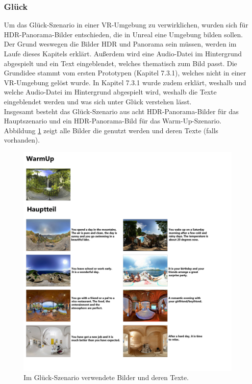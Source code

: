 \subsubsection{Gl{\"u}ck} \label{glueck-4}







Um das Gl{\"u}ck-Szenario in einer VR-Umgebung zu verwirklichen, wurden sich f{\"u}r HDR-Panorama-Bilder entschieden, die in Unreal eine Umgebung bilden sollen. 
Der Grund weswegen die Bilder HDR und Panorama sein m{\"u}ssen, werden im Laufe dieses Kapitels erkl{\"a}rt. 
Au{\ss}erdem wird eine Audio-Datei im Hintergrund abgespielt und ein Text eingeblendet, welches thematisch zum Bild passt. 
Die Grundidee stammt vom ersten Prototypen (Kapitel 7.3.1), welches nicht in einer VR-Umgebung gel{\"o}st wurde. 
In Kapitel 7.3.1 wurde zudem erkl{\"a}rt, weshalb und welche Audio-Datei im Hintergrund abgespielt wird, weshalb die Texte eingeblendet werden und was sich unter Gl{\"u}ck verstehen l{\"a}sst. \\

Insgesamt besteht das Gl{\"u}ck-Szenario aus acht HDR-Panorama-Bilder f{\"u}r das Hauptszenario und ein HDR-Panorama-Bild f{\"u}r das Warm-Up-Szenario. 
Abbildung \ref{fig-glueck4} zeigt alle Bilder die genutzt werden und deren Texte (falls vorhanden). \\

\begin{figure}[H] \centering
\includegraphics[width=15cm]{Images/gluck4.png} 
\vspace{-0.3cm} 
\caption[Im Gl{\"u}ck-Szenario verwendete Bilder und deren Texte]{Im Gl{\"u}ck-Szenario verwendete Bilder und deren Texte\cite{sun360}.}
\label{fig-glueck4} 
\end{figure}


